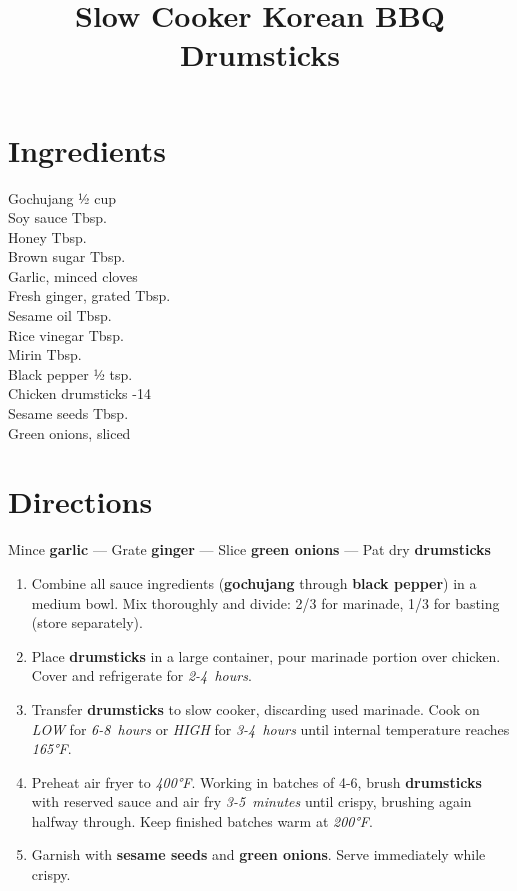 \documentclass[11pt,letterpaper]{article}
\title{Slow Cooker Korean BBQ Drumsticks}
\author{}
\date{}
\begin{document}
\maketitle
\thispagestyle{empty}

\section*{Ingredients}
\setlength{\columnsep}{20pt}
\begin{multicols}{2}
\noindent
    Gochujang \dotfill ½ cup \\
    Soy sauce  Tbsp. \\
    Honey  Tbsp. \\
    Brown sugar  Tbsp. \\
    Garlic, minced  cloves \\
    Fresh ginger, grated  Tbsp. \\
    Sesame oil  Tbsp. \\
    Rice vinegar  Tbsp. \\
    \columnbreak
    Mirin  Tbsp. \\
    Black pepper \dotfill ½ tsp. \\
    Chicken drumsticks -14 \\
    Sesame seeds  Tbsp. \\
    Green onions, sliced  \\
\end{multicols}

\section*{Directions}

\noindent
Mince \textbf{garlic} ---
Grate \textbf{ginger} ---
Slice \textbf{green onions} ---
Pat dry \textbf{drumsticks}

\begin{enumerate}
    \item Combine all sauce ingredients (\textbf{gochujang} through \textbf{black pepper}) in a medium bowl. Mix thoroughly and divide: 2/3 for marinade, 1/3 for basting (store separately).
    
    \item Place \textbf{drumsticks} in a large container, pour marinade portion over chicken. Cover and refrigerate for \textit{2-4~hours}.
    
    \item Transfer \textbf{drumsticks} to slow cooker, discarding used marinade. Cook on \textit{LOW} for \textit{6-8~hours} or \textit{HIGH} for \textit{3-4~hours} until internal temperature reaches \textit{165°F}.
    
    \item Preheat air fryer to \textit{400°F}. Working in batches of 4-6, brush \textbf{drumsticks} with reserved sauce and air fry \textit{3-5~minutes} until crispy, brushing again halfway through. Keep finished batches warm at \textit{200°F}.
    
    \item Garnish with \textbf{sesame seeds} and \textbf{green onions}. Serve immediately while crispy.
\end{enumerate}
\end{document}
